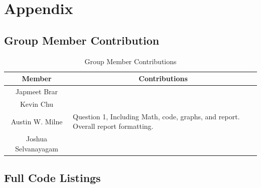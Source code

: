 \documentclass[12pt]{article}
\begin{document}
\section{Appendix} \label{sec:appendix}

\subsection{Group Member Contribution}

\begin{table}[]
    \centering
    \caption{Group Member Contributions}
    \label{tab:member_contribution}
    \begin{tabular}{|c|p{9cm}|} \hline
        Member & \multicolumn{1}{|c|}{Contributions} \\ \hline
        Japmeet Brar & \\ \hline
        Kevin Chu & \\ \hline
        Austin W. Milne & Question 1, Including Math, code, graphs, and report. Overall report formatting. \\ \hline
        Joshua Selvanayagam & \\ \hline
    \end{tabular}
\end{table}

\subsection{Full Code Listings} \label{sec:code_listings}


\clearpage
\end{document}
